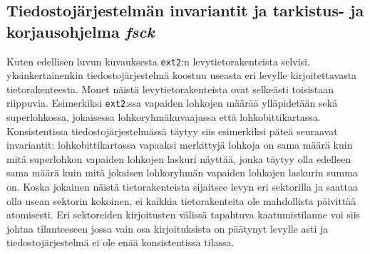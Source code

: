 \subsection{Tiedostojärjestelmän invariantit ja tarkistus- ja korjausohjelma \emph{fsck}}

Kuten edellisen luvun kuvauksesta \texttt{ext2}:n levytietorakenteista selvisi,
yksinkertainenkin tiedostojärjestelmä koostuu useasta eri levylle kirjoitettavasta tietorakenteesta.
Monet näistä levytietorakenteista ovat selkeästi toisistaan riippuvia.
Esimerkiksi \texttt{ext2}:ssa vapaiden lohkojen määrää ylläpidetään sekä superlohkossa, jokaisessa lohkoryhmäkuvaajassa että lohkobittikartassa.
Konsistentissa tiedostojärjestelmässä täytyy siis esimerkiksi päteä seuraavat invariantit: lohkobittikartassa vapaaksi merkittyjä lohkoja on sama määrä kuin mitä superlohkon vapaiden lohkojen laskuri näyttää,
jonka täytyy olla edelleen sama määrä kuin mitä jokaisen lohkoryhmän vapaiden lohkojen laskurin summa on.
Koska jokainen näistä tietorakenteista sijaitsee levyn eri sektorilla ja saattaa olla usean sektorin kokoinen,
ei kaikkia tietorakenteita ole mahdollista päivittää atomisesti.
Eri sektoreiden kirjoitusten välissä tapahtuva kaatumistilanne voi siis johtaa tilanteeseen jossa vain osa kirjoituksista on päätynyt levylle asti
ja tiedostojärjestelmä ei ole enää konsistentissa tilassa.

